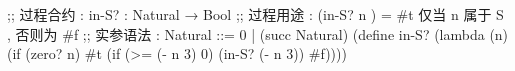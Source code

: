 \begin{codefence}
;; 过程合约 :  in-S? : Natural   → Bool
;; 过程用途 : (in-S?     n   )   = #t 仅当 n 属于 S , 否则为 #f
;; 实参语法 :          Natural ::=  0 | (succ Natural)
(define in-S? 
  (lambda (n)
    (if (zero? n) #t
        (if (>= (- n 3) 0) (in-S? (- n 3))
            #f))))
\end{codefence}